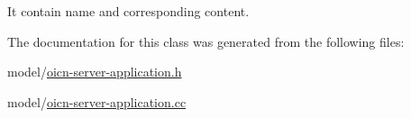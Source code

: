 It contain name and corresponding content. 



The documentation for this class was generated from the following files\-:\begin{DoxyCompactItemize}
\item 
model/\hyperlink{oicn-server-application_8h}{oicn-\/server-\/application.\-h}\item 
model/\hyperlink{oicn-server-application_8cc}{oicn-\/server-\/application.\-cc}\end{DoxyCompactItemize}
